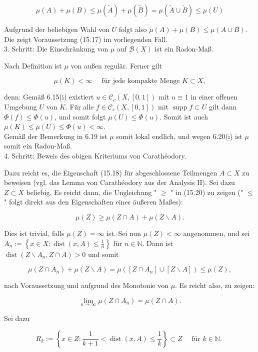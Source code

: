\documentclass[10pt, letterpaper]{article}
\begin{document}
$$
\mu(A)+\mu(B) \leq \mu(\tilde{A})+\mu(\tilde{B})=\mu(\tilde{A} \cup \tilde{B}) \leq \mu(U)
$$

Aufgrund der beliebigen Wahl von $U$ folgt also $\mu(A)+\mu(B) \leq \mu(A \cup B)$. Die zeigt Voraussetzung (15.17) im vorliegenden Fall.\\
3. Schritt: Die Einschränkung von $\mu$ auf $\mathcal{B}(X)$ ist ein Radon-Maß.

Nach Definition ist $\mu$ von außen regulär. Ferner gilt

$$
\mu(K)<\infty \quad \text { für jede kompakte Menge } K \subset X,
$$

denn: Gemäß 6.15(i) existiert $u \in \mathcal{C}_{c}(X,[0,1])$ mit $u \equiv 1$ in einer offenen Umgebung $U$ von $K$. Für alle $f \in \mathcal{C}_{c}(X,[0,1])$ mit $\operatorname{supp} f \subset U$ gilt dann $\Phi(f) \leq \Phi(u)$, und somit folgt $\mu(U) \leq \Phi(u)$. Somit ist auch $\mu(K) \leq \mu(U) \leq \Phi(u)<\infty$.\\
Gemäß der Bemerkung in 6.19 ist $\mu$ somit lokal endlich, und wegen 6.20(i) ist $\mu$ somit ein Radon-Maß.\\
4. Schritt: Beweis des obigen Kriteriums von Carathéodory.

Dazu reicht es, die Eigenschaft (15.18) für abgeschlossene Teilmengen $A \subset X$ zu beweisen (vgl. das Lemma von Carathéodory aus der Analysis II). Sei dazu $Z \subset X$ beliebig. Es reicht dann, die Ungleichung " $\geq$ " in (15.20) zu zeigen (" $\leq$ " folgt direkt aus den Eigenschaften eines äußeren Maßes):

$$
\mu(Z) \geq \mu(Z \cap A)+\mu(Z \backslash A) .
$$

Dies ist trivial, falls $\mu(Z)=\infty$ ist. Sei nun $\mu(Z)<\infty$ angenommen, und sei $A_{n}:= \left\{x \in X: \operatorname{dist}(x, A) \leq \frac{1}{n}\right\}$ für $n \in \mathbb{N}$. Dann ist $\operatorname{dist}\left(Z \backslash A_{n}, Z \cap A\right)>0$ und somit

$$
\mu\left(Z \cap A_{n}\right)+\mu(Z \backslash A)=\mu\left(\left[Z \cap A_{n}\right] \cup[Z \backslash A]\right) \leq \mu(Z),
$$

nach Voraussetzung und aufgrund des Monotonie von $\mu$. Es reicht also, zu zeigen:

$$
\lim _{n \rightarrow \infty} \mu\left(Z \cap A_{n}\right)=\mu(Z \cap A) .
$$

Sei dazu

$$
R_{k}:=\left\{x \in Z: \frac{1}{k+1}<\operatorname{dist}(x, A) \leq \frac{1}{k}\right\} \subset Z \quad \text { für } k \in \mathbb{N} \text {. }
$$
\end{document}
